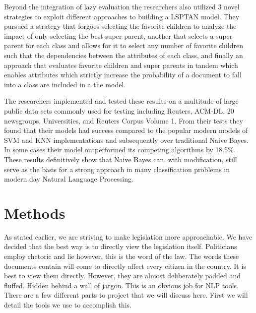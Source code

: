 \documentclass[11pt,a4paper]{article}
\begin{document}
Beyond the integration of lazy evaluation the researchers also utilized 3 novel strategies to exploit different approaches to building a LSPTAN model. They pursued a strategy that forgoes selecting the favorite children to analyze the impact of only selecting the best super parent, another that selects a super parent for each class and allows for it to select any number of favorite children such that the dependencies between the attributes of each class, and finally an approach that evaluates favorite children and super parents in tandem which enables attributes which strictly increase the probability of a document to fall into a class are included in a the model.

The researchers implemented and tested these results on a multitude of large public data sets commonly used for testing including Reuters, ACM-DL, 20 newsgroups, Universities, and Reuters Corpus Volume 1. From their tests they found that their models had success compared to the popular modern models of SVM and KNN implementations and subsequently over traditional Naive Bayes. In some cases their model outperformed its competing algorithms by 18.5\%. These results definitively show that Naive Bayes can, with modification, still serve as the basis for a strong approach in many classification problems in modern day Natural Language Processing.

\section{Methods}
As stated earlier, we are striving to make legislation more approachable. We have decided that the best way is to directly view the legislation itself. Politicians employ rhetoric and lie however, this is the word of the law. 
\newline\indent The words these documents contain will come to directly affect every citizen in the country. It is best to view them directly. However, they are almost deliberately padded and fluffed. Hidden behind a wall of jargon. This is an obvious job for NLP tools. There are a few different parts to project that we will discuss here. First we will detail the tools we use to accomplish this. 
\end{document}
